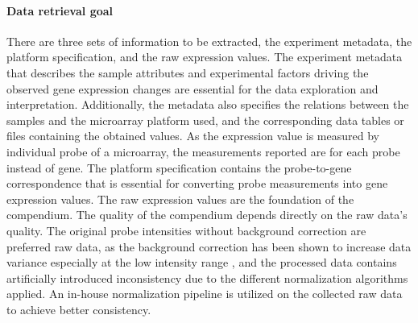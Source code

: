 






\paragraph{Data retrieval goal}\label{sec:command-data-goal}

There are three sets of information to be extracted, the experiment
metadata, the platform specification, and the raw expression values.
%
%
The experiment metadata that describes the sample attributes and experimental
factors driving the observed gene expression changes are essential for the
data exploration and interpretation.
%
Additionally, the metadata also specifies the relations between the samples
and the microarray platform used, and the corresponding data tables or files
containing the obtained values.
%
As the expression value is measured by individual probe of a microarray, the
measurements reported are for each probe instead of gene.
%
The platform specification contains the probe-to-gene correspondence that is
essential for converting probe measurements into gene expression values.
%
%
The raw expression values are the foundation of the compendium.  The quality of
the compendium depends directly on the raw data's quality.
%
The original probe intensities without background correction are preferred raw
data, as the background correction has been shown to increase data variance
especially at the low intensity range \cite{Irizarry2006, Ritchie2007}, and
the processed data contains artificially introduced inconsistency due to the
different normalization algorithms applied.
%
An in-house normalization pipeline is utilized on the collected raw data to
achieve better consistency.
%

